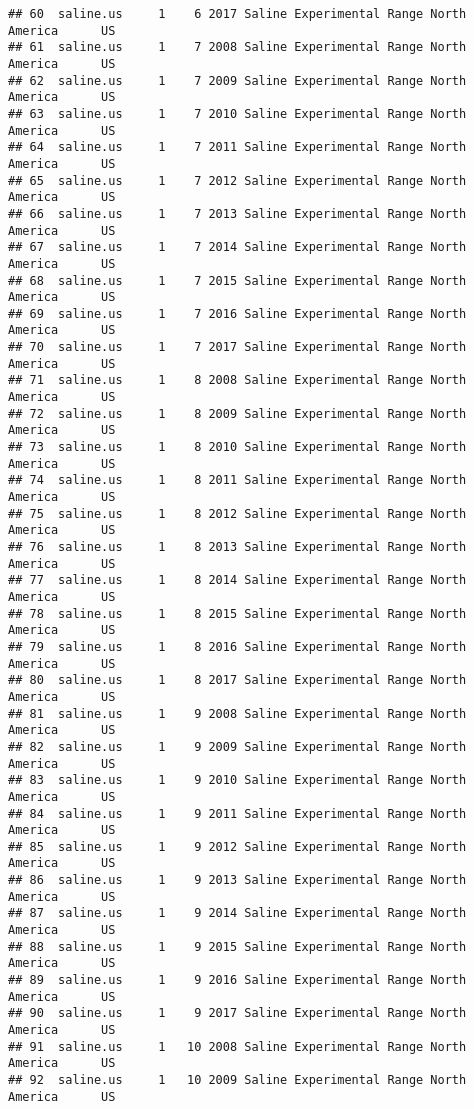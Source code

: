 \documentclass[]{article}
\begin{document}
\begin{verbatim}
## 60  saline.us     1    6 2017 Saline Experimental Range North America      US
## 61  saline.us     1    7 2008 Saline Experimental Range North America      US
## 62  saline.us     1    7 2009 Saline Experimental Range North America      US
## 63  saline.us     1    7 2010 Saline Experimental Range North America      US
## 64  saline.us     1    7 2011 Saline Experimental Range North America      US
## 65  saline.us     1    7 2012 Saline Experimental Range North America      US
## 66  saline.us     1    7 2013 Saline Experimental Range North America      US
## 67  saline.us     1    7 2014 Saline Experimental Range North America      US
## 68  saline.us     1    7 2015 Saline Experimental Range North America      US
## 69  saline.us     1    7 2016 Saline Experimental Range North America      US
## 70  saline.us     1    7 2017 Saline Experimental Range North America      US
## 71  saline.us     1    8 2008 Saline Experimental Range North America      US
## 72  saline.us     1    8 2009 Saline Experimental Range North America      US
## 73  saline.us     1    8 2010 Saline Experimental Range North America      US
## 74  saline.us     1    8 2011 Saline Experimental Range North America      US
## 75  saline.us     1    8 2012 Saline Experimental Range North America      US
## 76  saline.us     1    8 2013 Saline Experimental Range North America      US
## 77  saline.us     1    8 2014 Saline Experimental Range North America      US
## 78  saline.us     1    8 2015 Saline Experimental Range North America      US
## 79  saline.us     1    8 2016 Saline Experimental Range North America      US
## 80  saline.us     1    8 2017 Saline Experimental Range North America      US
## 81  saline.us     1    9 2008 Saline Experimental Range North America      US
## 82  saline.us     1    9 2009 Saline Experimental Range North America      US
## 83  saline.us     1    9 2010 Saline Experimental Range North America      US
## 84  saline.us     1    9 2011 Saline Experimental Range North America      US
## 85  saline.us     1    9 2012 Saline Experimental Range North America      US
## 86  saline.us     1    9 2013 Saline Experimental Range North America      US
## 87  saline.us     1    9 2014 Saline Experimental Range North America      US
## 88  saline.us     1    9 2015 Saline Experimental Range North America      US
## 89  saline.us     1    9 2016 Saline Experimental Range North America      US
## 90  saline.us     1    9 2017 Saline Experimental Range North America      US
## 91  saline.us     1   10 2008 Saline Experimental Range North America      US
## 92  saline.us     1   10 2009 Saline Experimental Range North America      US

\end{verbatim}
\end{document}
